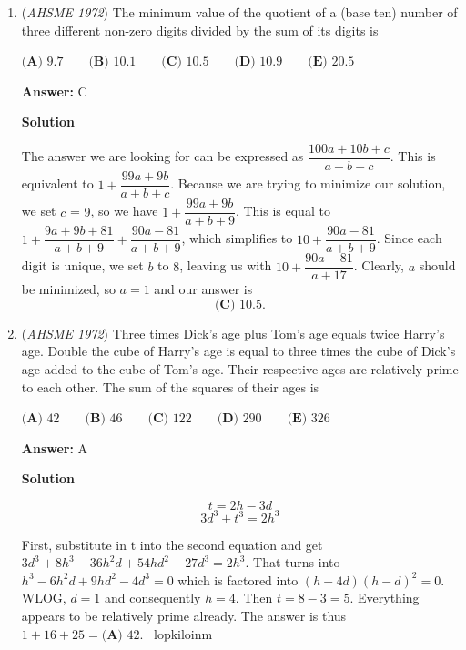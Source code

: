 \begin{enumerate}
 $\sqrt{{\overline {EM}}^2+{\overline {ON}}^2}=r$
$\sqrt{2^2+(\frac{7}{2})^2}$
$\sqrt{4+\frac{49}{4}}$
$\sqrt{\frac{65}{4}}$
$\frac{\sqrt{65}}{2}=r$

 Now that we have $r$, the diameter is just two times of that, so $\boxed{\textbf{(B)}\sqrt{65}}$



	\item (\textit{AHSME 1972}) The minimum value of the quotient of a (base ten) number of three different non-zero digits divided by the sum of its digits is


 $\textbf{(A) }9.7\qquad \textbf{(B) }10.1\qquad \textbf{(C) }10.5\qquad \textbf{(D) }10.9\qquad  \textbf{(E) }20.5$

 \textbf{Answer: }C



\textbf{Solution}

The answer we are looking for can be expressed as $\dfrac{100a+10b+c}{a+b+c}$. This is equivalent to $1 + \dfrac{99a+9b}{a+b+c}$. Because we are trying to minimize our solution, we set $c$ = $9$, so we have $1 + \dfrac{99a+9b}{a+b+9}$. This is equal to $1 + \dfrac{9a+9b+81}{a+b+9} + \dfrac{90a-81}{a+b+9}$, which simplifies to $10+ \dfrac{90a-81}{a+b+9}$. Since each digit is unique, we set $b$ to $8$, leaving us with $10 + \dfrac{90a-81}{a+17}$. Clearly, $a$ should be minimized, so $a = 1$ and our answer is 
 \[\boxed{\textbf{(C) }10.5}.\]



	\item (\textit{AHSME 1972}) Three times Dick's age plus Tom's age equals twice Harry's age. 
Double the cube of Harry's age is equal to three times the cube of Dick's age added to the cube of Tom's age. 
Their respective ages are relatively prime to each other. The sum of the squares of their ages is


 $\textbf{(A) }42\qquad \textbf{(B) }46\qquad \textbf{(C) }122\qquad \textbf{(D) }290\qquad  \textbf{(E) }326$

 \textbf{Answer: }A



\textbf{Solution}


 \[t=2h-3d\]
 \[3d^3+t^3=2h^3\]

 First, substitute in t into the second equation and get $3d^3+8h^3-36h^2d+54hd^2-27d^3=2h^3$. That turns into $h^3-6h^2d+9hd^2-4d^3=0$ which is factored into $(h-4d)(h-d)^2 =0.$ WLOG, $d=1$ and consequently $h=4$. Then $t=8-3=5$. Everything appears to be relatively prime already. The answer is thus $1+16+25=\boxed{\textbf{(A) }42}.$ ~lopkiloinm


\end{enumerate}
